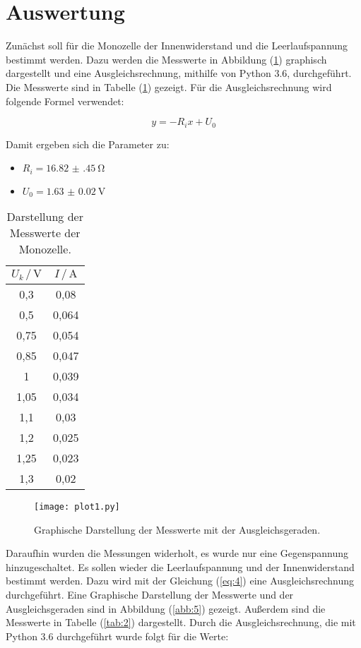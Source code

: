 \section{Auswertung}
Zunächst soll für die Monozelle der Innenwiderstand und die Leerlaufspannung
bestimmt werden. Dazu werden die Messwerte in Abbildung (\ref{abb:4}) graphisch dargestellt und eine Ausgleichsrechnung,
mithilfe von Python 3.6, durchgeführt. Die Messwerte sind in Tabelle (\ref{tab:1})
gezeigt. Für die Ausgleichsrechnung wird folgende Formel verwendet:

\begin{equation}
  y = -R_i x + U_0
  \label{eq:4}
\end{equation}

Damit ergeben sich die Parameter zu:

\begin{itemize}
  \item $R_i = \SI{16.82(45)}{\ohm}$
  \item $U_0 = \SI{1.63(2)}{\volt}$
\end{itemize}

\begin{table}[H]
  \centering
  \caption{Darstellung der Messwerte der Monozelle.}
  \label{tab:1}
  \begin{tabular}{c c}
    \toprule
    $U_k \, / \, \si{\volt}$ & $ I \, / \, \si{\ampere}$ \\
    \midrule
    0,3  & 0,08  \\
    0,5  & 0,064 \\
    0,75 & 0,054 \\
    0,85 & 0,047 \\
    1    & 0,039 \\
    1,05 & 0,034 \\
    1,1  & 0,03  \\
    1,2  & 0,025 \\
    1,25 & 0,023 \\
    1,3  & 0,02  \\
    \bottomrule
  \end{tabular}
\end{table}

\begin{figure}[H]
  \centering
  \texttt{[image: plot1.py]}
  \caption{Graphische Darstellung der Messwerte mit der Ausgleichsgeraden.}
  \label{abb:4}
\end{figure}

Daraufhin wurden die Messungen widerholt, es wurde nur eine Gegenspannung
hinzugeschaltet. Es sollen wieder die Leerlaufspannung und der Innenwiderstand bestimmt
werden. Dazu wird mit der Gleichung (\ref{eq:4}) eine Ausgleichsrechnung durchgeführt.
Eine Graphische Darstellung der Messwerte und der Ausgleichsgeraden sind in Abbildung (\ref{abb:5})
gezeigt. Außerdem sind die Messwerte in Tabelle (\ref{tab:2}) dargestellt.
Durch die Ausgleichsrechnung, die mit Python 3.6 durchgeführt wurde folgt für die Werte:

